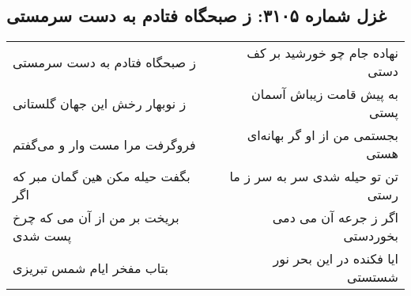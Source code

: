 \begin{center}
\section*{غزل شماره ۳۱۰۵: ز صبحگاه فتادم به دست سرمستی}
\label{sec:3105}
\begin{longtable}{l p{0.5cm} r}
ز صبحگاه فتادم به دست سرمستی
&&
نهاده جام چو خورشید بر کف دستی
\\
ز نوبهار رخش این جهان گلستانی
&&
به پیش قامت زیباش آسمان پستی
\\
فروگرفت مرا مست وار و می‌گفتم
&&
بجستمی من از او گر بهانه‌ای هستی
\\
بگفت حیله مکن هین گمان مبر که اگر
&&
تن تو حیله شدی سر به سر ز ما رستی
\\
بریخت بر من از آن می که چرخ پست شدی
&&
اگر ز جرعه آن می دمی بخوردستی
\\
بتاب مفخر ایام شمس تبریزی
&&
ایا فکنده در این بحر نور شستستی
\\
\end{longtable}
\end{center}
